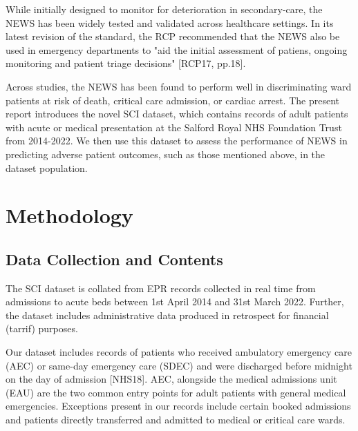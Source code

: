 \documentclass[10pt,journal,compsoc]{IEEEtran}
\begin{document}
While initially designed to monitor for deterioration in secondary-care, the NEWS has been widely tested and validated across healthcare settings. In its latest revision of the standard, the RCP recommended that the NEWS also be used in emergency departments to "aid the initial assessment of patiens, ongoing monitoring and patient triage decisions" [RCP17, pp.18].

Across studies, the NEWS has been found to perform well in discriminating ward patients at risk of death, critical care admission, or cardiac arrest. The present report introduces the novel SCI dataset, which contains records of adult patients with acute or medical presentation at the Salford Royal NHS Foundation Trust from 2014-2022. We then use this dataset to assess the performance of NEWS in predicting adverse patient outcomes, such as those mentioned above, in the dataset population.

\section{Methodology}
\subsection{Data Collection and Contents}
The SCI dataset is collated from EPR records collected in real time from admissions to acute beds between 1st April 2014 and 31st March 2022. Further, the dataset includes administrative data produced in retrospect for financial (tarrif) purposes.

Our dataset includes records of patients who received ambulatory emergency care (AEC) or same-day emergency care (SDEC) and were discharged before midnight on the day of admission [NHS18]. AEC, alongside the medical admissions unit (EAU)  are the two common entry points for adult patients with general medical emergencies. Exceptions present in our records include certain booked admissions and patients directly transferred and admitted to medical or critical care wards.
\end{document}
